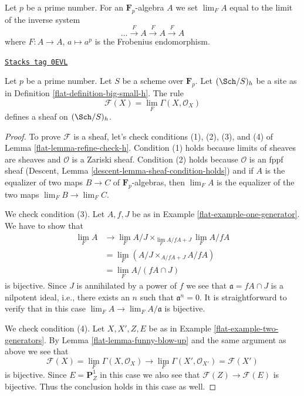 Let $p$ be a prime number. For an $\mathbf{F}_p$-algebra $A$
we set $\lim_F A$ equal to the limit of the inverse system
$$
\ldots \xrightarrow{F} A \xrightarrow{F} A \xrightarrow{F} A
$$
where $F : A \to A$, $a \mapsto a^p$ is the Frobenius endomorphism.

\begin{lemma}
\label{flat-lemma-h-sheaf-lim-F}
\href{https://stacks.math.columbia.edu/tag/0EVL}{\texttt{Stacks tag 0EVL}}

Let $p$ be a prime number. Let $S$ be a scheme over $\mathbf{F}_p$.
Let $(\Sch/S)_h$ be a site as in Definition \ref{flat-definition-big-small-h}.
The rule
$$
\mathcal{F}(X) = \lim_F \Gamma(X, \mathcal{O}_X)
$$
defines a sheaf on $(\Sch/S)_h$.
\end{lemma}

\begin{proof}

To prove $\mathcal{F}$ is a sheaf, let's check conditions
(1), (2), (3), and (4) of Lemma \ref{flat-lemma-refine-check-h}.
Condition (1) holds because limits of sheaves are sheaves
and $\mathcal{O}$ is a Zariski sheaf. Condition (2) holds because
$\mathcal{O}$ is an fppf sheaf (Descent, Lemma
\ref{descent-lemma-sheaf-condition-holds}) and if $A$ is the equalizer
of two maps $B \to C$ of $\mathbf{F}_p$-algebras, then $\lim_F A$
is the equalizer of the two maps $\lim_F B \to \lim_F C$.

\medskip\noindent
We check condition (3). Let $A, f, J$ be as in
Example \ref{flat-example-one-generator}.
We have to show that
\begin{align*}
\lim_F A
& \to
\lim_F A/J \times_{\lim_F A/fA + J} \lim_F A/fA \\
& =
\lim_F (A/J \times_{A/fA + J} A/fA) \\
& =
\lim_F A/(fA \cap J)
\end{align*}
is bijective. Since $J$ is annihilated by a power of $f$ we see that
$\mathfrak a = fA \cap J$ is a nilpotent ideal, i.e., there exists an
$n$ such that $\mathfrak a^n = 0$. It is straightforward
to verify that in this case $\lim_F A \to \lim_F A/\mathfrak a$
is bijective.

\medskip\noindent
We check condition (4). Let $X, X', Z, E$ be as in
Example \ref{flat-example-two-generators}. By
Lemma \ref{flat-lemma-funny-blow-up} and the same argument as above
we see that
$$
\mathcal{F}(X) = \lim_F \Gamma(X, \mathcal{O}_X)
\longrightarrow
\lim_F \Gamma(X', \mathcal{O}_{X'}) = \mathcal{F}(X')
$$
is bijective. Since $E = \mathbf{P}^1_Z$ in this case we also
see that $\mathcal{F}(Z) \to \mathcal{F}(E)$ is bijective.
Thus the conclusion holds in this case as well.
\end{proof}

